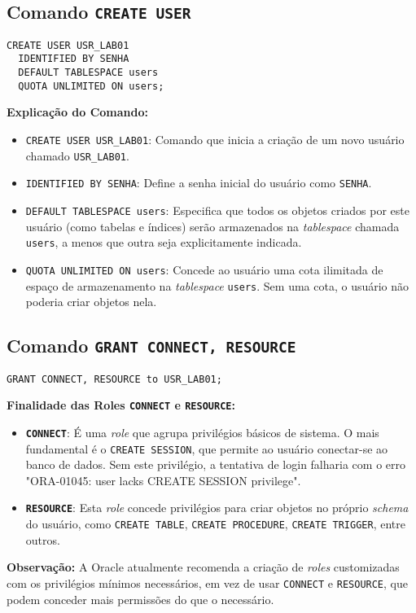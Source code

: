 \documentclass[a4paper, 12pt]{article}
\begin{document}
\subsection{Comando \texttt{CREATE USER}}
\begin{lstlisting}
CREATE USER USR_LAB01 
  IDENTIFIED BY SENHA 
  DEFAULT TABLESPACE users 
  QUOTA UNLIMITED ON users;
\end{lstlisting}
\textbf{Explicação do Comando:}
\begin{itemize}
	\item \texttt{CREATE USER USR\_LAB01}: Comando que inicia a criação de um novo usuário chamado \texttt{USR\_LAB01}.
	\item \texttt{IDENTIFIED BY SENHA}: Define a senha inicial do usuário como \texttt{SENHA}.
	\item \texttt{DEFAULT TABLESPACE users}: Especifica que todos os objetos criados por este usuário (como tabelas e índices) serão armazenados na \textit{tablespace} chamada \texttt{users}, a menos que outra seja explicitamente indicada.
	\item \texttt{QUOTA UNLIMITED ON users}: Concede ao usuário uma cota ilimitada de espaço de armazenamento na \textit{tablespace} \texttt{users}. Sem uma cota, o usuário não poderia criar objetos nela.
\end{itemize}

\subsection{Comando \texttt{GRANT CONNECT, RESOURCE}}
\begin{lstlisting}
GRANT CONNECT, RESOURCE to USR_LAB01;
\end{lstlisting}
\textbf{Finalidade das Roles \texttt{CONNECT} e \texttt{RESOURCE}:}
\begin{itemize}
	\item \textbf{\texttt{CONNECT}}: É uma \textit{role} que agrupa privilégios básicos de sistema. O mais fundamental é o \texttt{CREATE SESSION}, que permite ao usuário conectar-se ao banco de dados. Sem este privilégio, a tentativa de login falharia com o erro "ORA-01045: user lacks CREATE SESSION privilege".
	\item \textbf{\texttt{RESOURCE}}: Esta \textit{role} concede privilégios para criar objetos no próprio \textit{schema} do usuário, como \texttt{CREATE TABLE}, \texttt{CREATE PROCEDURE}, \texttt{CREATE TRIGGER}, entre outros.
\end{itemize}
\textbf{Observação:} A Oracle atualmente recomenda a criação de \textit{roles} customizadas com os privilégios mínimos necessários, em vez de usar \texttt{CONNECT} e \texttt{RESOURCE}, que podem conceder mais permissões do que o necessário.
\end{document}
